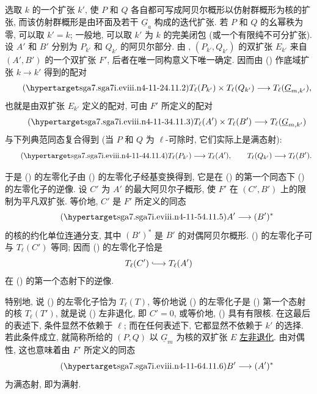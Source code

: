 选取 $k$ 的一个扩张 $k'$, 使 $P$ 和 $Q$ 各自都可写成阿贝尔概形以仿射群概形为核的扩张, 而该仿射群概形是由环面及若干 $\underline G_a$ 构成的迭代扩张. 若 $P$ 和 $Q$ 的幺幂秩为零, 可以取 $k'=k$; 一般地, 可以取 $k'$ 为 $k$ 的完美闭包 (或一个有限纯不可分扩张). 设 $A'$ 和 $B'$ 分别为 $P_{k'}$ 和 $Q_{k'}$ 的阿贝尔部分. 由 , $(P_{k'},Q_{k'})$ 的双扩张 $E_{k'}$ 来自 $(A',B')$ 的一个双扩张 $F'$, 后者在唯一同构意义下唯一确定. 因而由 () 作底域扩张 $k\to k'$ 得到的配对
\begin{equation}\tag{\SGARefTarget{sga7.sga7i.eviii.n4-11-2}{4.11.2}}
 T_\ell(P_{k'})\times T_\ell(Q_{k'})
 \longrightarrow T_\ell(\underline G_{m,k'}),
\end{equation}
也就是由双扩张 $E_{k'}$ 定义的配对, 可由 $F'$ 所定义的配对
\begin{equation}\tag{\SGARefTarget{sga7.sga7i.eviii.n4-11-3}{4.11.3}}
 T_\ell(A')\times T_\ell(B')
 \longrightarrow T_\ell(\underline G_{m,k'})
\end{equation}
与下列典范同态复合得到 (当 $P$ 和 $Q$ 为 $\ell$-可除时, 它们实际上是满态射):
\begin{equation}\tag{\SGARefTarget{sga7.sga7i.eviii.n4-11-4}{4.11.4}}
 T_\ell(P_{k'})\longrightarrow T_\ell(A'),
 \qquad
 T_\ell(Q_{k'})\longrightarrow T_\ell(B').
\end{equation}

于是 () 的左零化子由 () 的左零化子经基变换得到, 它是在 () 的第一个同态下 () 的左零化子的逆像. 设 $C'$ 为 $A'$ 的最大阿贝尔子概形, 使 $F'$ 在 $(C',B')$ 上的限制为平凡双扩张. 等价地, $C'$ 是 $F'$ 所定义的同态
\begin{equation}\tag{\SGARefTarget{sga7.sga7i.eviii.n4-11-5}{4.11.5}}
 A'\longrightarrow (B')^*
\end{equation}
的核的约化单位连通分支, 其中 $(B')^*$ 是 $B'$ 的对偶阿贝尔概形. () 的左零化子可与 $T_\ell(C')$ 等同; 因而 () 的左零化子恰是
\[
 T_\ell(C')\lhook\joinrel\longrightarrow T_\ell(A')
\]
在 () 的第一个态射下的逆像.

特别地, 说 () 的左零化子恰为 $T_\ell(T)$, 等价地说 () 的左零化子是 () 第一个态射的核 $T_\ell(T')$, 就是说 () 左非退化, 即 $C'=0$, 或等价地, () 具有有限核. 在这最后的表述下, 条件显然不依赖于 $\ell$; 而在任何表述下, 它都显然不依赖于 $k'$ 的选择. 若此条件成立, 就简称所给的 $(P,Q)$ 以 $\underline G_m$ 为核的双扩张 $E$ \underline{左非退化}. 由对偶性, 这也意味着由 $F'$ 所定义的同态
\begin{equation}\tag{\SGARefTarget{sga7.sga7i.eviii.n4-11-6}{4.11.6}}
 B'\longrightarrow (A')^*
\end{equation}
为满态射, 即为满射.

